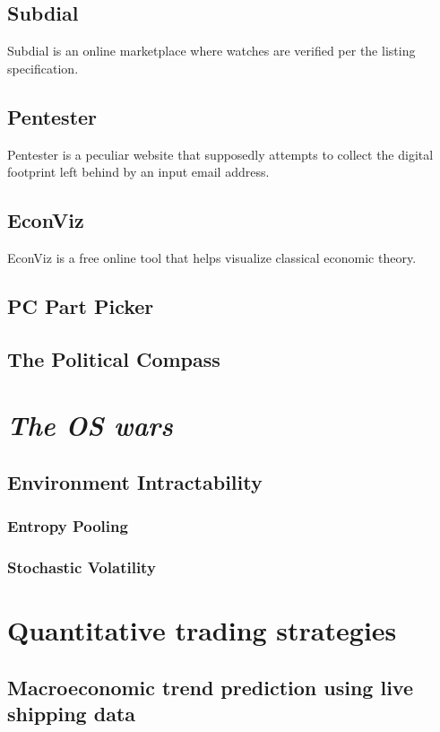 \documentclass[11pt]{article}
\begin{document}
\subsection{Subdial~\cite{a2023_subdial}}
Subdial is an online marketplace where watches are verified per the listing specification.
\subsection{Pentester~\cite{a2024_pentester}}
Pentester is a peculiar website that supposedly attempts to collect the digital footprint left behind by an input email address.
\subsection{EconViz~\cite{econvizorgmacroeconomicvisualizations_2025_econvizorg}}
EconViz is a free online tool that helps visualize classical economic theory.
\subsection{PC Part Picker}
\subsection{The Political Compass~\cite{thepoliticalcompass_2018_the}}

\section{\textit{The OS wars}}
\subsection{Environment Intractability}
\subsubsection{Entropy Pooling~\cite{vorobets_2024_portfolio}}
\subsubsection{Stochastic Volatility~\cite{heston_1993_a}~\cite{briciu_2024_estimating}}
\section{Quantitative trading strategies}
\subsection{Macroeconomic trend prediction using live shipping data}
\end{document}
